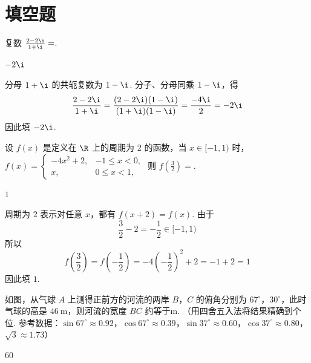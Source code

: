 \section{填空题}

\begin{problem}
复数 \( \frac{2-2\i}{1+\i}= \)\fillinblank{}.
\end{problem}

\begin{answer}
\(-2\i\)
\end{answer}

\begin{solution}
分母 \(1+\i\) 的共轭复数为 \(1-\i\). 分子、分母同乘 \(1-\i\)，得
\[
\frac{2-2\i}{1+\i}=\frac{(2-2\i)(1-\i)}{(1+\i)(1-\i)}=\frac{-4\i}{2}=-2\i
\]
因此填 \(-2\i\).
\end{solution}

\begin{problem}
设 \( f(x) \) 是定义在 \(\R\) 上的周期为 2 的函数，当 \( x \in [-1, 1) \) 时， \( f(x) = \begin{cases}
-4x^{2} + 2, & -1 \leqslant x < 0,\\
x, & 0 \leqslant x < 1,
\end{cases} \) 则 \( f\left(\frac{3}{2}\right) = \)\fillinblank{}.
\end{problem}

\begin{answer}
\(1\)
\end{answer}

\begin{solution}
周期为 \(2\) 表示对任意 \(x\)，都有 \(f(x+2)=f(x)\). 由于
\[
\frac32-2=-\frac12\in[-1,1)
\]
所以
\[
f\left(\frac32\right)=f\left(-\frac12\right)
=-4\left(-\frac12\right)^2+2=-1+2=1
\]
因此填 \(1\).
\end{solution}

\begin{problem}
如图，从气球 \(A\) 上测得正前方的河流的两岸 \(B\)，\(C\) 的俯角分别为 \(67^{\circ}\)，\(30^{\circ}\)，此时气球的高是 \(46\mathrm{~m}\)，则河流的宽度 \(BC\) 约等于\fillinblank{}\(\mathrm{m}\). （用四舍五入法将结果精确到个位. 参考数据：\(\sin 67^{\circ} \approx 0.92\)，\(\cos 67^{\circ} \approx 0.39\)，\(\sin 37^{\circ} \approx 0.60\)，\(\cos 37^{\circ} \approx 0.80\)，\(\sqrt{3} \approx 1.73\)）

\end{problem}

\begin{answer}
\(60\)
\end{answer}

